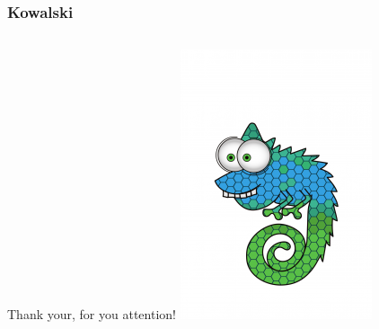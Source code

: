 \documentclass[aspectratio=169]{beamer}
\begin{document}
\begin{frame}[fragile]
\frametitle{Kowalski}
\begin{columns}
Thank your, for you attention!
\includegraphics[width=.8\linewidth]{vector-chameleon-213x300}
\end{columns}
\end{frame}
\end{document}
